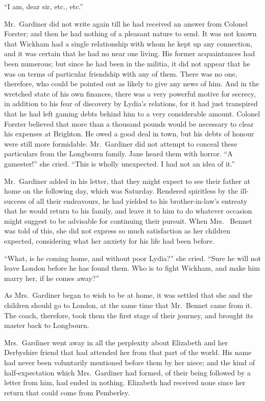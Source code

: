 \medskip
``I am, dear sir, etc., etc.''
\bigskip

Mr.\ Gardiner did not write again till he had received an answer
from Colonel Forster; and then he had nothing of a pleasant
nature to send.  It was not known that Wickham had a single
relationship with whom he kept up any connection, and it
was certain that he had no near one living.  His former
acquaintances had been numerous; but since he had been in the
militia, it did not appear that he was on terms of particular
friendship with any of them.  There was no one, therefore, who
could be pointed out as likely to give any news of him.  And
in the wretched state of his own finances, there was a very
powerful motive for secrecy, in addition to his fear of discovery
by Lydia's relations, for it had just transpired that he had
left gaming debts behind him to a very considerable amount.
Colonel Forster believed that more than a thousand pounds
would be necessary to clear his expenses at Brighton.  He owed
a good deal in town, but his debts of honour were still more
formidable.  Mr.\ Gardiner did not attempt to conceal these
particulars from the Longbourn family.  Jane heard them with
horror.  ``A gamester!'' she cried.  ``This is wholly unexpected.
I had not an idea of it.''

Mr.\ Gardiner added in his letter, that they might expect to see
their father at home on the following day, which was Saturday.
Rendered spiritless by the ill-success of all their endeavours, he
had yielded to his brother-in-law's entreaty that he would return
to his family, and leave it to him to do whatever occasion might
suggest to be advisable for continuing their pursuit.  When Mrs.\ %
Bennet was told of this, she did not express so much satisfaction
as her children expected, considering what her anxiety for his
life had been before.

``What, is he coming home, and without poor Lydia?'' she cried.
``Sure he will not leave London before he has found them.  Who
is to fight Wickham, and make him marry her, if he comes away?''

As Mrs.\ Gardiner began to wish to be at home, it was settled
that she and the children should go to London, at the same time
that Mr.\ Bennet came from it.  The coach, therefore, took them
the first stage of their journey, and brought its master back
to Longbourn.

Mrs.\ Gardiner went away in all the perplexity about Elizabeth
and her Derbyshire friend that had attended her from that part
of the world.  His name had never been voluntarily mentioned
before them by her niece; and the kind of half-expectation which
Mrs.\ Gardiner had formed, of their being followed by a letter
from him, had ended in nothing.  Elizabeth had received none
since her return that could come from Pemberley.

